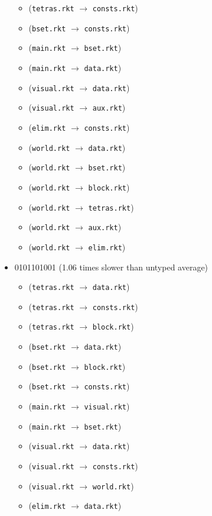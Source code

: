 \documentclass{article}
\newcommand{\mono}[1]{\texttt{#1}}
\begin{document}
\begin{itemize}
\begin{itemize}
  \item (\mono{tetras.rkt} $\rightarrow$ \mono{consts.rkt})
  \item (\mono{bset.rkt} $\rightarrow$ \mono{consts.rkt})
  \item (\mono{main.rkt} $\rightarrow$ \mono{bset.rkt})
  \item (\mono{main.rkt} $\rightarrow$ \mono{data.rkt})
  \item (\mono{visual.rkt} $\rightarrow$ \mono{data.rkt})
  \item (\mono{visual.rkt} $\rightarrow$ \mono{aux.rkt})
  \item (\mono{elim.rkt} $\rightarrow$ \mono{consts.rkt})
  \item (\mono{world.rkt} $\rightarrow$ \mono{data.rkt})
  \item (\mono{world.rkt} $\rightarrow$ \mono{bset.rkt})
  \item (\mono{world.rkt} $\rightarrow$ \mono{block.rkt})
  \item (\mono{world.rkt} $\rightarrow$ \mono{tetras.rkt})
  \item (\mono{world.rkt} $\rightarrow$ \mono{aux.rkt})
  \item (\mono{world.rkt} $\rightarrow$ \mono{elim.rkt})
  \end{itemize}
\item 0101101001 (1.06 times slower than untyped average)
  \begin{itemize}
  \item (\mono{tetras.rkt} $\rightarrow$ \mono{data.rkt})
  \item (\mono{tetras.rkt} $\rightarrow$ \mono{consts.rkt})
  \item (\mono{tetras.rkt} $\rightarrow$ \mono{block.rkt})
  \item (\mono{bset.rkt} $\rightarrow$ \mono{data.rkt})
  \item (\mono{bset.rkt} $\rightarrow$ \mono{block.rkt})
  \item (\mono{bset.rkt} $\rightarrow$ \mono{consts.rkt})
  \item (\mono{main.rkt} $\rightarrow$ \mono{visual.rkt})
  \item (\mono{main.rkt} $\rightarrow$ \mono{bset.rkt})
  \item (\mono{visual.rkt} $\rightarrow$ \mono{data.rkt})
  \item (\mono{visual.rkt} $\rightarrow$ \mono{consts.rkt})
  \item (\mono{visual.rkt} $\rightarrow$ \mono{world.rkt})
  \item (\mono{elim.rkt} $\rightarrow$ \mono{data.rkt})

\end{itemize}
\end{itemize}
\end{document}
